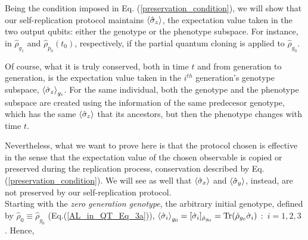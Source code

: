 \documentclass[11pt]{article}
\numberwithin{equation}{section} %
\numberwithin{figure}{section} %
\begin{document}
Being the condition imposed in Eq. (\ref{preservation_condition}), we will show that our self-replication protocol  maintains $\braket{\hat{\sigma}_z}$, the expectation value taken in the two output qubits: either the genotype or the phenotype subspace. For instance, in $\hat{\rho}_{g_1}$ and $\hat{\rho}_{p_0}(t_0)$, respectively, if the partial quantum cloning is applied to $\hat{\rho}_{g_0}$. 

Of course, what it is truly conserved, both in time $t$ and from generation to generation, is the expectation value taken in the $i^{th}$ generation's genotype subspace, $\braket{\hat{\sigma}_z}_{g_i}$. For the same individual, both the genotype and the phenotype subspace are created using the information of the same predecesor genotype, which has the same $\braket{\hat{\sigma}_z}$ that its ancestors, but then the phenotype changes with time $t$. 

Nevertheless, what we want to prove here is that the protocol chosen is effective in the sense that the expectation value of the chosen observable is copied or preserved during the replication process, conservation described by Eq. (\ref{preservation_condition}). We will see as well that $\braket{\hat{\sigma}_x}$ and $\braket{\hat{\sigma}_y}$, instead, are not preserved by our self-replication protocol.\\

Starting with the \emph{zero generation genotype}, the arbitrary initial genotype, defined by $\hat{\rho}_0 \equiv \hat{\rho}_{g_0}$ (Eq.(\ref{AL_in_QT_Eq_3a})),  $\braket{\hat{\sigma}_i}_{g_0}=[\hat{\sigma}_i]_{\hat{\rho}_{g_0}}=\textrm{Tr}(\hat{\rho}_{g_0}\hat{\sigma}_i)$ $:$ $i=1,2,3$ \cite[p.~181, Eq.~(3.4.10)]{Sakurai}. Hence,
\end{document}
